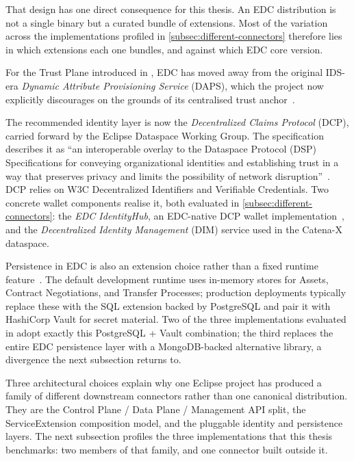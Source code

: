 That design has one direct consequence for this thesis. An EDC distribution is not a single binary but a curated bundle of extensions. Most of the variation across the implementations profiled in \cref{subsec:different-connectors} therefore lies in which extensions each one bundles, and against which EDC core version.

For the Trust Plane introduced in , EDC has moved away from the original IDS-era \emph{Dynamic Attribute Provisioning Service} (DAPS), which the project now explicitly discourages on the grounds of its centralised trust anchor~\citep{eclipseEdcDocumentation}. 

The recommended identity layer is now the \emph{Decentralized Claims Protocol} (DCP), carried forward by the Eclipse Dataspace Working Group. The specification describes it as ``an interoperable overlay to the Dataspace Protocol (DSP) Specifications for conveying organizational identities and establishing trust in a way that preserves privacy and limits the possibility of network disruption''~\citep{dcpSpec}. DCP relies on W3C Decentralized Identifiers and Verifiable Credentials. Two concrete wallet components realise it, both evaluated in \cref{subsec:different-connectors}: the \emph{EDC IdentityHub}, an EDC-native DCP wallet implementation~\citep{eclipseEdcIdentityHub}, and the \emph{Decentralized Identity Management} (DIM) service used in the Catena-X dataspace.

Persistence in EDC is also an extension choice rather than a fixed runtime feature~\citep{eclipseEdcDocumentation}. The default development runtime uses in-memory stores for Assets, Contract Negotiations, and Transfer Processes; production deployments typically replace these with the SQL extension backed by PostgreSQL and pair it with HashiCorp Vault for secret material. Two of the three implementations evaluated in  adopt exactly this PostgreSQL + Vault combination; the third replaces the entire EDC persistence layer with a MongoDB-backed alternative library, a divergence the next subsection returns to.

Three architectural choices explain why one Eclipse project has produced a family of different downstream connectors rather than one canonical distribution. They are the Control Plane / Data Plane / Management API split, the ServiceExtension composition model, and the pluggable identity and persistence layers. The next subsection profiles the three implementations that this thesis benchmarks: two members of that family, and one connector built outside it.


